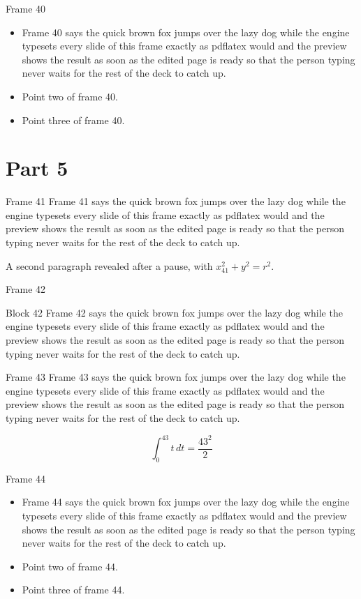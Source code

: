 \documentclass{beamer}
\begin{document}
\begin{frame}{Frame 40}
  \begin{itemize}
    \item<1-> Frame 40 says the quick brown fox jumps over the lazy dog while the engine typesets every slide of this frame exactly as pdflatex would and the preview shows the result as soon as the edited page is ready so that the person typing never waits for the rest of the deck to catch up.
    \item<2-> Point two of frame 40.
    \item<3-> Point three of frame 40.
  \end{itemize}
\end{frame}
\section{Part 5}
\begin{frame}{Frame 41}
  Frame 41 says the quick brown fox jumps over the lazy dog while the engine typesets every slide of this frame exactly as pdflatex would and the preview shows the result as soon as the edited page is ready so that the person typing never waits for the rest of the deck to catch up.
  \pause

  A second paragraph revealed after a pause, with $x_{41}^2 + y^2 = r^2$.
\end{frame}
\begin{frame}{Frame 42}
  \begin{block}{Block 42}
    Frame 42 says the quick brown fox jumps over the lazy dog while the engine typesets every slide of this frame exactly as pdflatex would and the preview shows the result as soon as the edited page is ready so that the person typing never waits for the rest of the deck to catch up.
  \end{block}
\end{frame}
\begin{frame}{Frame 43}
  Frame 43 says the quick brown fox jumps over the lazy dog while the engine typesets every slide of this frame exactly as pdflatex would and the preview shows the result as soon as the edited page is ready so that the person typing never waits for the rest of the deck to catch up.

  \[ \int_0^{43} t\,dt = \frac{43^2}{2} \]
\end{frame}
\begin{frame}{Frame 44}
  \begin{itemize}
    \item<1-> Frame 44 says the quick brown fox jumps over the lazy dog while the engine typesets every slide of this frame exactly as pdflatex would and the preview shows the result as soon as the edited page is ready so that the person typing never waits for the rest of the deck to catch up.
    \item<2-> Point two of frame 44.
    \item<3-> Point three of frame 44.
  \end{itemize}
\end{frame}
\end{document}
